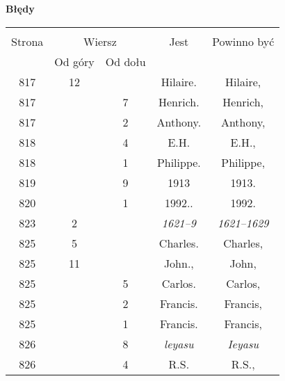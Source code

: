 \documentclass[a4paper,11pt]{article}
\newcommand{\tb}{\textbf}
\newcommand{\Center}[1]{\begin{center} #1 \end{center}}
\newcommand{\CenterTB}[1]{\Center{\tb{#1}}}
\begin{document}
\CenterTB{Błędy}
\begin{center}
  \begin{tabular}{|c|c|c|c|c|}
    \hline
    & \multicolumn{2}{c|}{} & & \\
    Strona & \multicolumn{2}{c|}{Wiersz}& Jest & Powinno być \\ \cline{2-3}
    & Od góry & Od dołu &  &  \\ \hline
    817 & 12 & & Hilaire. & Hilaire, \\
    817 & & 7 & Henrich. & Henrich, \\
    817 & & 2 & Anthony. & Anthony, \\
    818 & & 4 & E.H. & E.H., \\
    818 & & 1 & Philippe. & Philippe, \\
    819 & & 9 & 1913 & 1913. \\
    820 & & 1 & 1992.. & 1992. \\
    823 &  2 & & \emph{1621--9} & \emph{1621--1629} \\
    825 &  5 & & Charles. & Charles, \\
    825 & 11 & & John., & John, \\
    825 & & 5 & Carlos. & Carlos, \\
    825 & & 2 & Francis. & Francis, \\
    825 & & 1 & Francis. & Francis, \\
    826 & & 8 & \emph{leyasu} & \emph{Ieyasu} \\
    826 & & 4 & R.S. & R.S., \\
    \hline
  \end{tabular}
\end{center}
\end{document}
